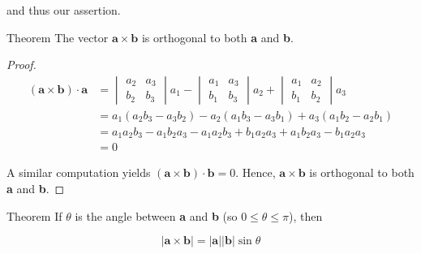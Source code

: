         and thus our assertion.

        \begin{theorem}{Theorem}
            The vector $\mathbf{a\times b}$ is orthogonal to both \textbf{a} and \textbf{b}.
        \end{theorem}

        \begin{proof}
            \begin{align*}
                \mathbf{(a\times b) \cdot a}    &=  \begin{vmatrix}
                                                        a_2 & a_3 \\
                                                        b_2 & b_3
                                                    \end{vmatrix} a_1 -
                                                    \begin{vmatrix}
                                                        a_1 & a_3 \\
                                                        b_1 & b_3
                                                    \end{vmatrix} a_2 +
                                                    \begin{vmatrix}
                                                        a_1 & a_2 \\
                                                        b_1 & b_2
                                                    \end{vmatrix} a_3 \\
                                                &= a_1 (a_2 b_3 - a_3 b_2) - a_2 (a_1 b_3 - a_3 b_1) + a_3 (a_1 b_2 - a_2 b_1) \\
                                                &= a_1 a_2 b_3 - a_1 b_2 a_3 - a_1 a_2 b_3 + b_1 a_2 a_3 + a_1 b_2 a_3 - b_1 a_2 a_3 \\
                                                &= 0
            \end{align*}

            A similar computation yields $\mathbf{(a\times b)\cdot b} = 0$. Hence, $\mathbf{a\times b}$ is orthogonal to both \textbf{a} and \textbf{b}.
        \end{proof}

        \begin{theorem}{Theorem}
            If $\theta$ is the angle between \textbf{a} and \textbf{b} (so $0 \leq \theta \leq \pi$), then

            \[
                |\mathbf{a\times b}| = |\mathbf{a}||\mathbf{b}|\sin{\theta}
            \]
        \end{theorem}

